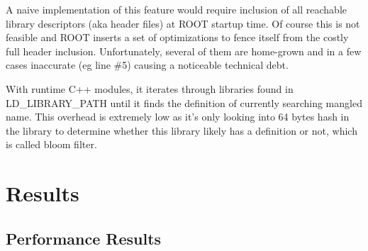 \documentclass{webofc}
\begin{document}
A naive implementation of this feature would require inclusion of all reachable library descriptors (aka header files) at ROOT startup time. Of course this is not feasible and ROOT inserts a set of optimizations to fence itself from the costly full header inclusion. Unfortunately, several of them are home-grown and in a few cases inaccurate (eg line \#5) causing a noticeable technical debt.

With runtime C++ modules, it iterates through libraries found in LD\_LIBRARY\_PATH until it finds the definition of currently searching mangled name. This overhead is extremely low as it's only looking into 64 bytes hash in the library to determine whether this library likely has a definition or not, which is called bloom filter.

\section{Results}
\label{results}

\subsection{Performance Results}
\label{performance}
\end{document}
